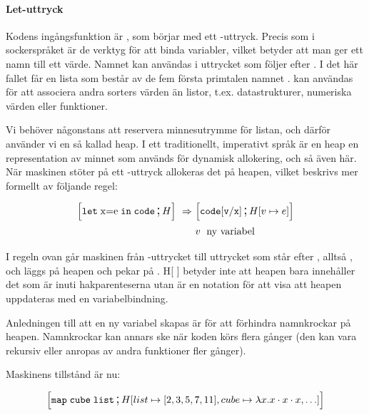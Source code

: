 \documentclass[../Core]{subfiles}
\begin{document}
\paragraph{Let-uttryck}
Kodens ingångsfunktion är , som börjar med ett -uttryck.
Precis som i sockerspråket är de verktyg för att binda variabler, 
vilket betyder att man ger ett
namn till ett värde. Namnet kan användas i uttrycket som följer efter .
I det här fallet får en lista som består av de fem första primtalen namnet .
 kan användas för att associera andra sorters värden än listor,
t.ex. datastrukturer, numeriska värden eller funktioner.

 Vi behöver någonstans att reservera minnesutrymme för listan, och därför
använder vi en så kallad heap. I ett traditionellt, imperativt språk är
en heap en representation av minnet som används för dynamisk allokering,
och så även här. När
maskinen stöter på ett -uttryck allokeras det på heapen, vilket
beskrivs mer formellt av följande regel:

\begin{align*}
\text{\large$$}\Big[\mathtt{let\;\mathrm{x\mathtt{=}e}\; in\; code} \,\text{\Large;}\, H\Big]\,\,\Rightarrow\,\, & \text{\large$$}\Big[\mathtt{code[v/x]} \,\text{\Large;}\, H[v\mapsto e]\Big] \\
 & v\; \text{ ny variabel} \nonumber
\end{align*}

I regeln ovan går maskinen från -uttrycket till
uttrycket som står efter , alltså ,
och  läggs på heapen och pekar på .
H{[} {]} betyder inte att heapen bara innehåller det som är inuti
hakparenteserna utan är en notation för att visa att heapen
uppdateras med en variabelbindning.

Anledningen till att en ny variabel  skapas är för att förhindra 
namnkrockar på heapen. Namnkrockar kan annars ske när koden körs flera gånger 
(den kan vara rekursiv eller anropas av andra funktioner fler gånger). 


Maskinens tillstånd är nu:

\begin{align*}
\text{\large$$}\Big[\mathtt{map\; cube\; list} \,\text{\Large;}\, H[list\mapsto[2,3,5,7,11],cube\mapsto\lambda x.x\cdot x\cdot x,\ldots]\Big]
\end{align*}
\end{document}
